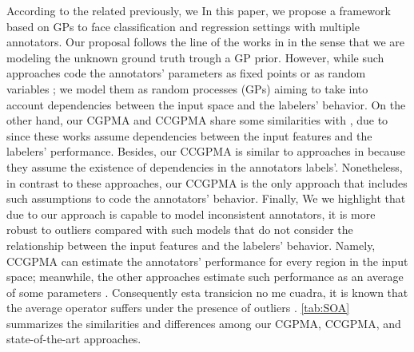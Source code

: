 \documentclass[journal]{IEEEtran}
\newcommand{\comment}[2]{{\color{blue}#1} {\color{red}#2}}
\begin{document}
\comment{According to the related previously, we}{In this paper, we}
propose a framework based on GPs to face classification and regression
settings with multiple annotators. Our proposal follows the line of
the works in
\cite{rodrigues2014gaussian,groot2011learning,ruiz2019learning,morales2019scalable,morales2019scalable1}
in the sense that we are modeling the unknown ground truth trough a GP
prior. However, while such approaches code the annotators' parameters
as fixed points \cite{rodrigues2014gaussian,groot2011learning} or as
random variables
\cite{ruiz2019learning,morales2019scalable,morales2019scalable1}; we
model them as random processes (GPs) aiming to take into account
dependencies between the input space and the labelers' behavior. On
the other hand, our CGPMA and CCGPMA share some similarities
\comment{}{with} \cite{yan2014learning,xiao2013learning}, \comment{due to}{since} these
works assume dependencies between the input features and the labelers'
performance. Besides, our CCGPMA is similar to approaches in
\cite{zhu2019unsupervised,gil2018learning} because they assume the
existence of dependencies in the annotators labels'.  Nonetheless, in
contrast to these approaches, our CCGPMA is the only approach that
includes such assumptions to code the annotators' behavior. Finally,
\comment{We}{we} highlight that due to our approach is capable to model inconsistent
annotators, it is more robust to outliers compared with such models
that do not consider the relationship between the input features and
the labelers' behavior. Namely, CCGPMA can estimate the annotators'
performance for every region in the input space; meanwhile, the other
approaches estimate such performance as an average of some parameters
\cite{rodrigues2017learning,morales2019scalable,ruiz2019learning}. \comment{Consequently}{esta transicion no me cuadra},
it is known that the average operator suffers under the presence of
outliers \cite{kara2015modeling}. \cref{tab:SOA} summarizes the
similarities and differences among our CGPMA, CCGPMA, and
state-of-the-art approaches.
\end{document}
